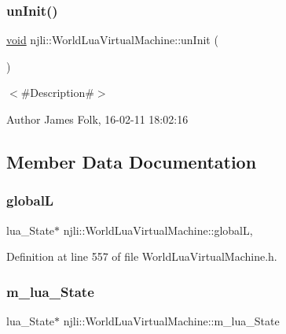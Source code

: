 \subsubsection{\texorpdfstring{un\+Init()}{unInit()}}
{\footnotesize\ttfamily \mbox{\hyperlink{_thread_8h_af1e856da2e658414cb2456cb6f7ebc66}{void}} njli\+::\+World\+Lua\+Virtual\+Machine\+::un\+Init (\begin{DoxyParamCaption}{ }\end{DoxyParamCaption})}



$<$\#\+Description\#$>$ 

\begin{DoxyAuthor}{Author}
James Folk, 16-\/02-\/11 18\+:02\+:16 
\end{DoxyAuthor}


\subsection{Member Data Documentation}
\mbox{\label{classnjli_1_1_world_lua_virtual_machine_a510bd0513272a37d5837555719f658de}} 
\subsubsection{\texorpdfstring{globalL}{globalL}}
{\footnotesize\ttfamily lua\+\_\+\+State$\ast$ njli\+::\+World\+Lua\+Virtual\+Machine\+::globalL\hspace{0.3cm}{\ttfamily [static]}, {\ttfamily [private]}}



Definition at line 557 of file World\+Lua\+Virtual\+Machine.\+h.

\mbox{\label{classnjli_1_1_world_lua_virtual_machine_abe1c0bd72cd6dc032a3c52886bf3f920}} 
\subsubsection{\texorpdfstring{m\+\_\+lua\+\_\+\+State}{m\_lua\_State}}
{\footnotesize\ttfamily lua\+\_\+\+State$\ast$ njli\+::\+World\+Lua\+Virtual\+Machine\+::m\+\_\+lua\+\_\+\+State\hspace{0.3cm}{\ttfamily [protected]}}




